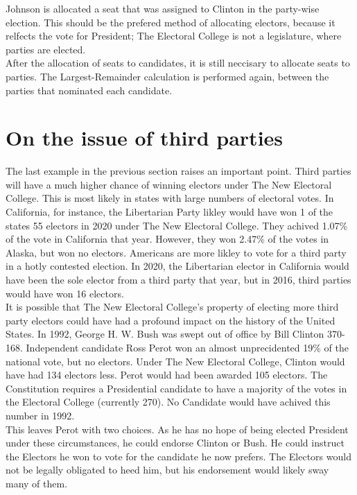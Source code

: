 \documentclass{article}
\begin{document}
    Johnson is allocated a seat that was assigned to Clinton in the party-wise election. This should be the prefered method of allocating electors, because it relfects the vote for President; The Electoral College is not a legislature, where parties are elected.\\
    
    After the allocation of seats to candidates, it is still neccisary to allocate seats to parties. The Largest-Remainder calculation is performed again, between the parties that nominated each candidate.

    \section{On the issue of third parties}

    The last example in the previous section raises an important point. Third parties will have a much higher chance of winning electors under The New Electoral College. This is most likely in states with large numbers of electoral votes. In California, for instance, the Libertarian Party likley would have won 1 of the states 55 electors in 2020 under The New Electoral College. They achived 1.07\% of the vote in California that year. However, they won 2.47\% of the votes in Alaska, but won no electors. Americans are more likley to vote for a third party in a hotly contested election. In 2020, the Libertarian elector in California would have been the sole elector from a third party that year, but in 2016, third parties would have won 16 electors.\\

    It is possible that The New Electoral College's property of electing more third party electors could have had a profound impact on the history of the United States. In 1992, George H. W. Bush was swept out of office by Bill Clinton 370-168. Independent candidate Ross Perot won an almost unprecidented 19\% of the national vote, but no electors. Under The New Electoral College, Clinton would have had 134 electors less. Perot would had been awarded 105 electors. The Constitution requires a Presidential candidate to have a majority of the votes in the Electoral College (currently 270). No Candidate would have achived this number in 1992.\\
    
    This leaves Perot with two choices. As he has no hope of being elected President under these circumstances, he could endorse Clinton or Bush. He could instruct the Electors he won to vote for the candidate he now prefers. The Electors would not be legally obligated to heed him, but his endorsement would likely sway many of them.\\
    
\end{document}
